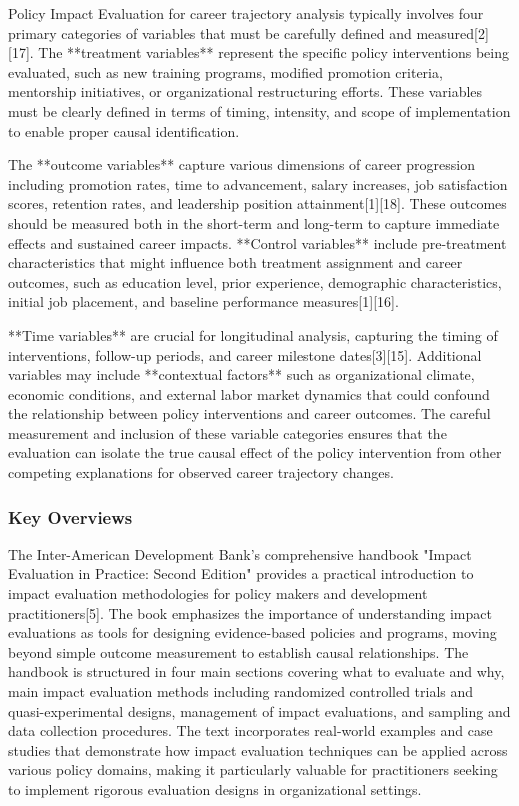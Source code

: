 \documentclass[main.tex]{subfiles}
\begin{document}
Policy Impact Evaluation for career trajectory analysis typically involves four primary categories of variables that must be carefully defined and measured[2][17]. The **treatment variables** represent the specific policy interventions being evaluated, such as new training programs, modified promotion criteria, mentorship initiatives, or organizational restructuring efforts. These variables must be clearly defined in terms of timing, intensity, and scope of implementation to enable proper causal identification.

The **outcome variables** capture various dimensions of career progression including promotion rates, time to advancement, salary increases, job satisfaction scores, retention rates, and leadership position attainment[1][18]. These outcomes should be measured both in the short-term and long-term to capture immediate effects and sustained career impacts. **Control variables** include pre-treatment characteristics that might influence both treatment assignment and career outcomes, such as education level, prior experience, demographic characteristics, initial job placement, and baseline performance measures[1][16].

**Time variables** are crucial for longitudinal analysis, capturing the timing of interventions, follow-up periods, and career milestone dates[3][15]. Additional variables may include **contextual factors** such as organizational climate, economic conditions, and external labor market dynamics that could confound the relationship between policy interventions and career outcomes. The careful measurement and inclusion of these variable categories ensures that the evaluation can isolate the true causal effect of the policy intervention from other competing explanations for observed career trajectory changes.

\subsubsection{Key Overviews}


The Inter-American Development Bank's comprehensive handbook "Impact Evaluation in Practice: Second Edition" provides a practical introduction to impact evaluation methodologies for policy makers and development practitioners[5]. The book emphasizes the importance of understanding impact evaluations as tools for designing evidence-based policies and programs, moving beyond simple outcome measurement to establish causal relationships. The handbook is structured in four main sections covering what to evaluate and why, main impact evaluation methods including randomized controlled trials and quasi-experimental designs, management of impact evaluations, and sampling and data collection procedures. The text incorporates real-world examples and case studies that demonstrate how impact evaluation techniques can be applied across various policy domains, making it particularly valuable for practitioners seeking to implement rigorous evaluation designs in organizational settings.
\end{document}
